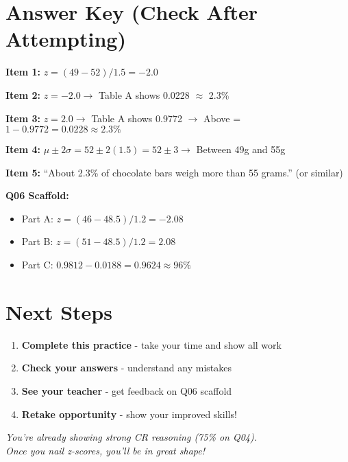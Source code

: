 \documentclass[11pt]{article}
\begin{document}
\vspace{0.3in}

\section*{Answer Key (Check After Attempting)}

\begin{tcolorbox}[colback=green!5!white,colframe=green!75!black,title=\textbf{Solutions}]

\textbf{Item 1:} $z = (49 - 52) / 1.5 = -2.0$

\vspace{0.1in}

\textbf{Item 2:} $z = -2.0 \rightarrow$ Table A shows 0.0228 $\approx$ 2.3\%

\vspace{0.1in}

\textbf{Item 3:} $z = 2.0 \rightarrow$ Table A shows 0.9772 $\rightarrow$ Above = $1 - 0.9772 = 0.0228 \approx 2.3\%$

\vspace{0.1in}

\textbf{Item 4:} $\mu \pm 2\sigma = 52 \pm 2(1.5) = 52 \pm 3 \rightarrow$ Between 49g and 55g

\vspace{0.1in}

\textbf{Item 5:} ``About 2.3\% of chocolate bars weigh more than 55 grams.'' (or similar)

\vspace{0.1in}

\textbf{Q06 Scaffold:}
\begin{itemize}
    \item Part A: $z = (46 - 48.5) / 1.2 = -2.08$
    \item Part B: $z = (51 - 48.5) / 1.2 = 2.08$
    \item Part C: $0.9812 - 0.0188 = 0.9624 \approx 96\%$
\end{itemize}

\end{tcolorbox}

\vspace{0.2in}

\section*{Next Steps}

\begin{enumerate}
    \item \textbf{Complete this practice} - take your time and show all work
    \item \textbf{Check your answers} - understand any mistakes
    \item \textbf{See your teacher} - get feedback on Q06 scaffold
    \item \textbf{Retake opportunity} - show your improved skills!
\end{enumerate}

\vspace{0.2in}

\begin{center}
\textit{You're already showing strong CR reasoning (75\% on Q04).}\\
\textit{Once you nail z-scores, you'll be in great shape!}
\end{center}
\end{document}

